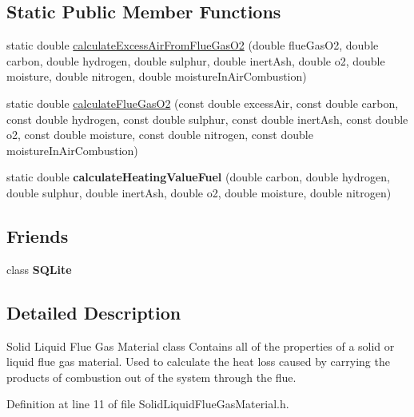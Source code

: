 \subsection*{Static Public Member Functions}
\begin{DoxyCompactItemize}
\item 
static double \hyperlink{class_solid_liquid_flue_gas_material_a57ddf04184687f8efe031986b591ad6b}{calculate\+Excess\+Air\+From\+Flue\+Gas\+O2} (double flue\+Gas\+O2, double carbon, double hydrogen, double sulphur, double inert\+Ash, double o2, double moisture, double nitrogen, double moisture\+In\+Air\+Combustion)
\item 
static double \hyperlink{class_solid_liquid_flue_gas_material_ae299abc71cd64822ad05af1a9b1a2ec1}{calculate\+Flue\+Gas\+O2} (const double excess\+Air, const double carbon, const double hydrogen, const double sulphur, const double inert\+Ash, const double o2, const double moisture, const double nitrogen, const double moisture\+In\+Air\+Combustion)
\item 
\mbox{\label{class_solid_liquid_flue_gas_material_aa6f11cd466965e30af4f8c30d7a5f402}} 
static double {\bfseries calculate\+Heating\+Value\+Fuel} (double carbon, double hydrogen, double sulphur, double inert\+Ash, double o2, double moisture, double nitrogen)
\end{DoxyCompactItemize}
\subsection*{Friends}
\begin{DoxyCompactItemize}
\item 
\mbox{\label{class_solid_liquid_flue_gas_material_ac7d22f3ca36435f73d55df60dc799e14}} 
class {\bfseries S\+Q\+Lite}
\end{DoxyCompactItemize}


\subsection{Detailed Description}
Solid Liquid Flue Gas Material class Contains all of the properties of a solid or liquid flue gas material. Used to calculate the heat loss caused by carrying the products of combustion out of the system through the flue. 

Definition at line 11 of file Solid\+Liquid\+Flue\+Gas\+Material.\+h.



